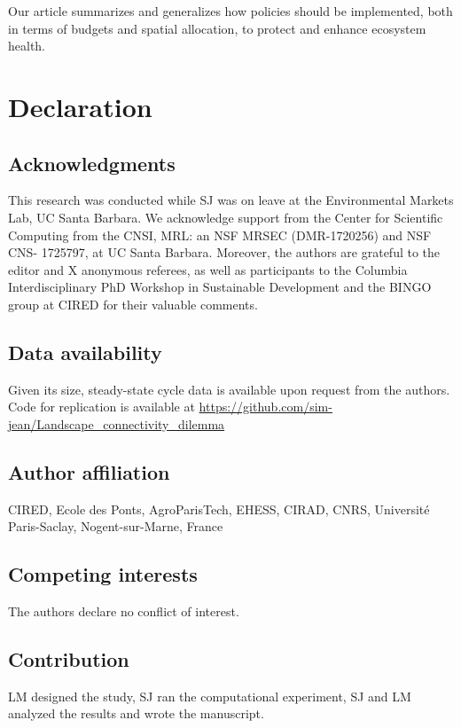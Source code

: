 Our article summarizes and generalizes how policies should be implemented, both in terms of budgets and spatial allocation, to protect and enhance ecosystem health.

\section{Declaration}
\subsection{Acknowledgments}
This research was conducted while SJ was on leave at the Environmental Markets Lab, UC Santa Barbara. We acknowledge support from the Center for Scientific Computing from the CNSI, MRL: an NSF MRSEC (DMR-1720256) and NSF CNS- 1725797, at UC Santa Barbara. Moreover, the authors are grateful to the editor and X anonymous referees, as well as participants to the Columbia Interdisciplinary PhD Workshop in Sustainable Development and the BINGO group at CIRED for their valuable comments. 

\subsection{Data availability}
Given its size, steady-state cycle data is available upon request from the authors. Code for replication is available at \url{https://github.com/sim-jean/Landscape_connectivity_dilemma}

\subsection{Author affiliation}
CIRED, Ecole des Ponts, AgroParisTech, EHESS, CIRAD, CNRS, Université Paris-Saclay, Nogent-sur-Marne, France
\subsection{Competing interests}
The authors declare no conflict of interest.

\subsection{Contribution}
LM designed the study, SJ ran the computational experiment, SJ and LM analyzed the results and wrote the manuscript.

\newpage



\renewcommand{\thesection}{\Alph{section}}
\setcounter{section}{0}
\renewcommand{\thesubsection}{\Alph{subsection}}
\setcounter{subsection}{0}
\newpage
{}

